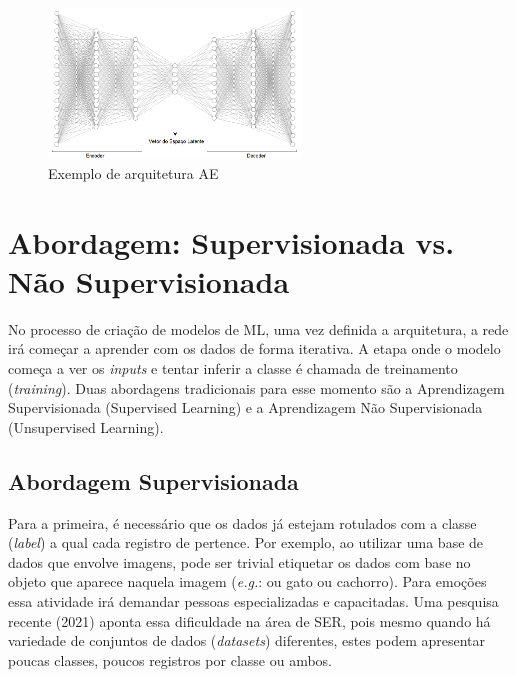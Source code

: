 \begin{figure}[!h]
\centering
\includegraphics[width=0.6\textwidth]{img/ex-ae.PNG}
\caption{\label{fig:exarqae}Exemplo de arquitetura \acrshort{AE}}
\end{figure}

\section{Abordagem: Supervisionada vs. Não Supervisionada}\label{sec:spvsup}

No processo de criação de modelos de \acrshort{ML}, uma vez definida a arquitetura, a rede irá começar a aprender com os dados de forma iterativa. A etapa onde o modelo começa a ver os \textit{inputs} e tentar inferir a classe é chamada de treinamento (\textit{training}). Duas abordagens tradicionais para esse momento são a Aprendizagem Supervisionada (Supervised Learning) e a Aprendizagem Não Supervisionada (Unsupervised Learning).

\subsection{Abordagem Supervisionada}

Para a primeira, é necessário que os dados já estejam rotulados com a classe (\textit{label}) a qual cada registro de pertence. Por exemplo, ao utilizar uma base de dados que envolve imagens, pode ser trivial etiquetar os dados com base no objeto que aparece naquela imagem (\textit{e.g.}: ou gato ou cachorro). Para emoções essa atividade irá demandar pessoas especializadas e capacitadas. Uma pesquisa~\cite{32} recente (2021) aponta essa dificuldade na área de \acrshort{SER}, pois mesmo quando há variedade de conjuntos de dados (\textit{datasets}) diferentes, estes podem apresentar poucas classes, poucos registros por classe ou ambos.

